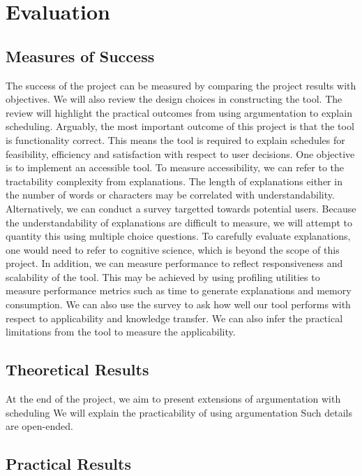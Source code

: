 \chapter{Evaluation}

\section{Measures of Success}

The success of the project can be measured by comparing the project results with objectives. We will also review the design choices in constructing the tool. The review will highlight the practical outcomes from using argumentation to explain scheduling.
\linespace
Arguably, the most important outcome of this project is that the tool is functionality correct. This means the tool is required to explain schedules for feasibility, efficiency and satisfaction with respect to user decisions.
\linespace
One objective is to implement an accessible tool. To measure accessibility, we can refer to the tractability complexity from explanations. The length of explanations either in the number of words or characters may be correlated with understandability. Alternatively, we can conduct a survey targetted towards potential users. Because the understandability of explanations are difficult to measure, we will attempt to quantity this using multiple choice questions. To carefully evaluate explanations, one would need to refer to cognitive science, which is beyond the scope of this project. In addition, we can measure performance to reflect responsiveness and scalability of the tool. This may be achieved by using profiling utilities to measure performance metrics such as time to generate explanations and memory consumption.
\linespace
We can also use the survey to ask how well our tool performs with respect to applicability and knowledge transfer. We can also infer the practical limitations from the tool to measure the applicability.

\section{Theoretical Results}

At the end of the project, we aim to present extensions of argumentation with scheduling We will explain the practicability of using argumentation Such details are open-ended.

\section{Practical Results} 

